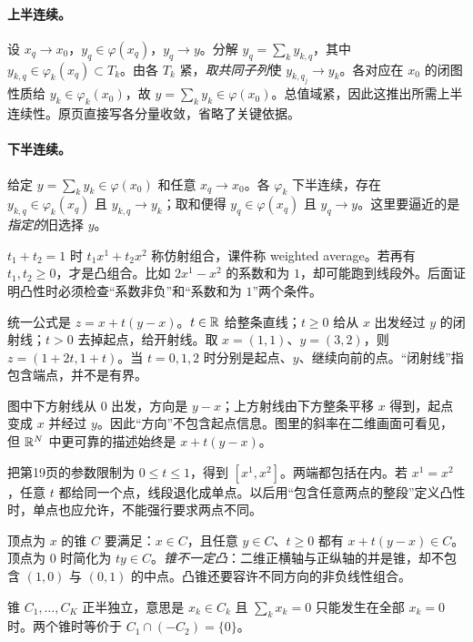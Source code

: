 \paragraph{上半连续。} 设 $x_q\to x_0$，$y_q\in\varphi(x_q)$，$y_q\to y$。分解 $y_q=\sum_k y_{k,q}$，其中 $y_{k,q}\in\varphi_k(x_q)\subset T_k$。由各 $T_k$ 紧，\emph{取共同子列}使 $y_{k,q_j}\to y_k$。各对应在 $x_0$ 的闭图性质给 $y_k\in\varphi_k(x_0)$，故 $y=\sum_k y_k\in\varphi(x_0)$。总值域紧，因此这推出所需上半连续性。原页直接写各分量收敛，省略了关键依据。
\paragraph{下半连续。} 给定 $y=\sum_k y_k\in\varphi(x_0)$ 和任意 $x_q\to x_0$。各 $\varphi_k$ 下半连续，存在 $y_{k,q}\in\varphi_k(x_q)$ 且 $y_{k,q}\to y_k$；取和便得 $y_q\in\varphi(x_q)$ 且 $y_q\to y$。这里要逼近的是\emph{指定的}旧选择 $y$。

$t_1+t_2=1$ 时 $t_1x^1+t_2x^2$ 称仿射组合，课件称 weighted average。若再有 $t_1,t_2\ge0$，才是凸组合。比如 $2x^1-x^2$ 的系数和为 $1$，却可能跑到线段外。后面证明凸性时必须检查“系数非负”和“系数和为 $1$”两个条件。

统一公式是 $z=x+t(y-x)$。$t\in\mathbb{R}$ 给整条直线；$t\ge0$ 给从 $x$ 出发经过 $y$ 的闭射线；$t>0$ 去掉起点，给开射线。取 $x=(1,1)$、$y=(3,2)$，则 $z=(1+2t,1+t)$。当 $t=0,1,2$ 时分别是起点、$y$、继续向前的点。“闭射线”指包含端点，并不是有界。

图中下方射线从 $0$ 出发，方向是 $y-x$；上方射线由下方整条平移 $x$ 得到，起点变成 $x$ 并经过 $y$。因此“方向”不包含起点信息。图里的斜率在二维画面可看见，但 $\mathbb{R}^N$ 中更可靠的描述始终是 $x+t(y-x)$。

把第19页的参数限制为 $0\le t\le1$，得到 $[x^1,x^2]$。两端都包括在内。若 $x^1=x^2$，任意 $t$ 都给同一个点，线段退化成单点。以后用“包含任意两点的整段”定义凸性时，单点也应允许，不能强行要求两点不同。

顶点为 $x$ 的锥 $C$ 要满足：$x\in C$，且任意 $y\in C$、$t\ge0$ 都有 $x+t(y-x)\in C$。顶点为 $0$ 时简化为 $t y\in C$。\emph{锥不一定凸}：二维正横轴与正纵轴的并是锥，却不包含 $(1,0)$ 与 $(0,1)$ 的中点。凸锥还要容许不同方向的非负线性组合。

锥 $C_1,\ldots,C_K$ 正半独立，意思是 $x_k\in C_k$ 且 $\sum_kx_k=0$ 只能发生在全部 $x_k=0$ 时。两个锥时等价于 $C_1\cap(-C_2)=\{0\}$。
